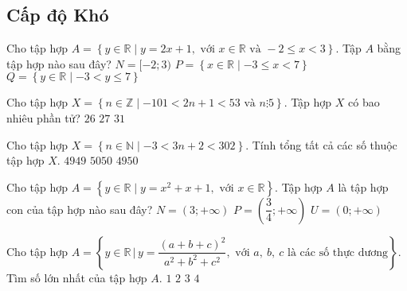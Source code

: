 \subsection*{Cấp độ Khó}
\begin{ex}%
	Cho tập hợp  $A = \left\{y \in \mathbb{R} \mid y = 2x+1, \text{ với } x \in  \mathbb{R} \text{ và } -2 \le x < 3\right\}$. Tập $A$ bằng tập hợp nào sau đây?
	{ $N = [-2;3)$}
	{\True $P =  \left\{x \in  \mathbb{R} \mid -3 \le x < 7\right\}$}
	{$Q =  \left\{y \in  \mathbb{R} \mid -3 <  y \le 7 \right\}$}
\end{ex}
\begin{ex}%
	Cho tập hợp $X = \left\{ n \in \mathbb{Z} \mid - 101 < 2n+1 <  53 \text{ và } n \vdots 5 \right\}$. Tập hợp $X$ có bao nhiêu phần tử? 
	{\True $ 26$}
	{$ 27$}
	{$ 31$}
\end{ex}
\begin{ex}%
	Cho tập hợp $X = \left\{ n \in \mathbb{N} \mid - 3 < 3n+2 <  302 \right\}$. Tính tổng tất cả các số thuộc tập hợp $X$. 
	{$ 4949$}
	{$ 5050$}
	{\True $ 4950$}
\end{ex}
\begin{ex}%
	Cho tập hợp  $A = \left\{y \in \mathbb{R} \mid y = x^2+x+1, \text{ với } x \in  \mathbb{R}\right\}$. Tập hợp $A$ là tập hợp con của tập hợp nào sau đây?
	\choice{$M = \left(-\infty;\dfrac{3}{4}\right] $}
	{$N = (3;+\infty) $}
	{$P = \left(\dfrac{3}{4};+\infty\right) $}
	{\True $U = (0;+\infty) $}
\end{ex}
\begin{ex}%
	Cho tập hợp $A = \left\{y \in \mathbb{R} \, \big| \,  y = \dfrac{(a+b+c)^2}{a^2+b^2+c^2}, \text{ với } a,\ b,\ c \text{ là các số thực dương}\right\}$. Tìm số lớn nhất của tập hợp $A$.
	\choice
	{$ 1$}
	{$2 $}
	{\True $3 $}
	{$ 4$}
\end{ex}

